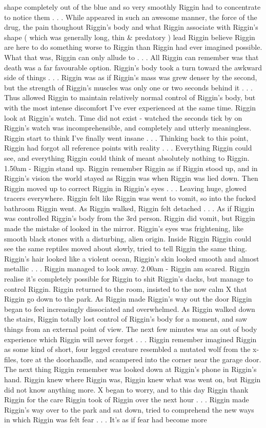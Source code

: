 \documentclass[12pt]{book}
\begin{document}
shape completely out of the blue and so very smoothly Riggin had to concentrate to notice them . . .  While appeared in such an awesome manner, the force of the drug, the pain thoughout Riggin's body and what Riggin associate with Riggin's shape ( which was generally long, thin \& predatory ) lead Riggin believe Riggin are here to do something worse to Riggin than Riggin had ever imagined possible. What that was, Riggin can only allude to . . .  All Riggin can remember was that death was a far favourable option. Riggin's body took a turn toward the awkward side of things . . .  Riggin was as if Riggin's mass was grew denser by the second, but the strength of Riggin's muscles was only one or two seconds behind it . . .  Thus allowed Riggin to maintain relatively normal control of Riggin's body, but with the most intense discomfort I've ever experienced at the same time. Riggin look at Riggin's watch. Time did not exist - watched the seconds tick by on Riggin's watch was incomprehensible, and completely and utterly meaningless. Riggin start to think I've finally went insane . . .  Thinking back to this point, Riggin had forgot all reference points with reality . . .  Everything Riggin could see, and everything Riggin could think of meant absolutely nothing to Riggin. 1.50am - Riggin stand up. Riggin remember Riggin as if Riggin stood up, and in Riggin's vision the world stayed as Riggin was when Riggin was lied down. Then Riggin moved up to correct Riggin in Riggin's eyes . . .  Leaving huge, glowed tracers everywhere. Riggin felt like Riggin was went to vomit, so into the fucked bathroom Riggin went. As Riggin walked, Riggin felt detached . . .  As if Riggin was controlled Riggin's body from the 3rd person. Riggin did vomit, but Riggin made the mistake of looked in the mirror. Riggin's eyes was frightening, like smooth black stones with a disturbing, alien origin. Inside Riggin Riggin could see the same reptiles moved about slowly, tried to tell Riggin the same thing. Riggin's hair looked like a violent ocean, Riggin's skin looked smooth and almost metallic . . .  Riggin managed to look away. 2.00am - Riggin am scared. Riggin realise it's completely possible for Riggin to shit Riggin's dacks, but manage to control Riggin. Riggin returned to the room, insisted to the now calm X that Riggin go down to the park. As Riggin made Riggin's way out the door Riggin began to feel increasingly dissociated and overwhelmed. As Riggin walked down the stairs, Riggin totally lost control of Riggin's body for a moment, and saw things from an external point of view. The next few minutes was an out of body experience which Riggin will never forget . . .  Riggin remember imagined Riggin as some kind of short, four legged creature resembled a mutated wolf from the x-files, tore at the doorhandle, and scampered into the corner near the garage door. The next thing Riggin remember was looked down at Riggin's phone in Riggin's hand. Riggin knew where Riggin was, Riggin knew what was went on, but Riggin did not know anything more. X began to worry, and to this day Riggin thank Riggin for the care Riggin took of Riggin over the next hour . . .  Riggin made Riggin's way over to the park and sat down, tried to comprehend the new ways in which Riggin was felt fear . . .  It's as if fear had become more 
\end{document}
